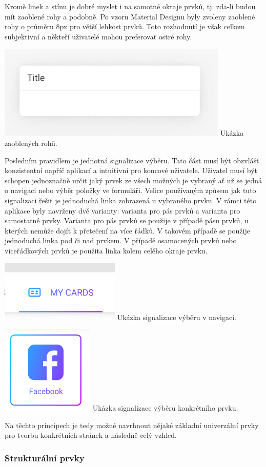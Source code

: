 		Kromě linek a stínu je dobré myslet i na samotné okraje prvků, tj. zda-li budou mít zaoblené rohy a podobně.
		Po vzoru Material Designu byly zvoleny zaoblené rohy o průměru 8px pro větší lehkost prvků.
		Toto rozhodnutí je však celkem subjektivní a někteří uživatelé mohou preferovat ostré rohy.

		\includegraphics[width=0.24\linewidth]{obrazky/blok_obsahu}\hfill
		Ukázka zaoblených rohů. %

		Posledním pravidlem je jednotná signalizace výběru.
		Tato část musí být obzvlášť konzistentní napříč aplikací a intuitivní pro koncové uživatele.
		Uživatel musí být schopen jednoznačně určit jaký prvek ze všech možných je vybraný ať už se jedná o navigaci
		nebo výběr položky ve formuláři.
		Velice používaným způsem jak tuto signalizaci řešit je jednoduchá linka zobrazená u vybraného prvku.
		V rámci této aplikace byly navrženy dvě varianty: varianta pro pás prvků a varianta pro samostatné prvky.
		Varianta pro pás prvků se použije v případě pásu prvků, u kterých nemůže dojít k přetečení na více řádků.
		V takovém případě se použije jednoduchá linka pod či nad prvkem.
		V případě osamocených prvků nebo víceřádkových prvků je použita linka kolem celého okraje prvku.

		\includegraphics[width=0.24\linewidth]{obrazky/ukazka_vyberu_1}\hfill
		Ukázka signalizace výběru v navigaci. %

		\includegraphics[width=0.24\linewidth]{obrazky/ukazka_vyberu_2}\hfill
		Ukázka signalizace výběru konkrétního prvku. %

		Na těchto principech je tedy možné navrhnout nějaké základní univerzální prvky pro tvorbu konkrétních stránek
		a následně celý vzhled.

		\subsubsection{Strukturální prvky}

